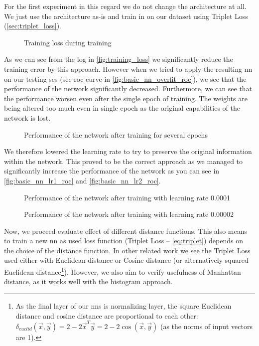 For the first experiment in this regard we do not change the architecture at all. We just use the architecture as-is and train in on our dataset using Triplet Loss (\autoref{sec:triplet_loss}).

\begin{figure}
    \centering
    \def\svgwidth{\columnwidth}
    \large
    \scalebox{0.8}{}
    \caption{Training loss during training}
    \label{fig:training_loss}
\end{figure}

As we can see from the log in \autoref{fig:training_loss} we significantly reduce the training error by this approach. However when we tried to apply the resulting \gls{nn} on our testing \gls{ses} (see \gls{roc} curve in \autoref{fig:basic_nn_overfit_roc}), we see that the performance of the network significantly decreased. Furthermore, we can see that the performance worsen even after the single epoch of training. The weights are being altered too much even in single epoch as the original capabilities of the network is lost.

\begin{figure}
    \centering
    \def\svgwidth{\columnwidth}
    
    \caption{Performance of the network after training for several epochs}
    \label{fig:basic_nn_overfit_roc}
\end{figure}

We therefore lowered the learning rate to try to preserve the original information within the network. This proved to be the correct approach as we managed to significantly increase the performance of the network as you can see in \autoref{fig:basic_nn_lr1_roc} and \autoref{fig:basic_nn_lr2_roc}.

\begin{figure}
    \centering
    \def\svgwidth{\columnwidth}
    
    \caption{Performance of the network after training with learning rate 0.0001}
    \label{fig:basic_nn_lr1_roc}
\end{figure}

\begin{figure}
    \centering
    \def\svgwidth{\columnwidth}
    
    \caption{Performance of the network after training with learning rate 0.00002}
    \label{fig:basic_nn_lr2_roc}
\end{figure}

Now, we proceed evaluate effect of different distance functions. This also means to train a new \gls{nn} as used loss function (Triplet Loss -- \autoref{eq:triplet}) depends on the choice of the distance function. In other related work we see the Triplet Loss used either with Euclidean distance or Cosine distance (or alternatively squared Euclidean distance\footnote{As the final layer of our \glspl{nn} is normalizing layer, the square Euclidean distance and cosine distance are proportional to each other: $\delta_{euclid}(\vec{x}, \vec{y}) = 2 - 2\vec{x}^T\vec{y} = 2 - 2 \cos(\vec{x}, \vec{y})$ (as the norms of input vectors are 1).}). However, we also aim to verify usefulness of Manhattan distance, as it works well with the histogram approach.

